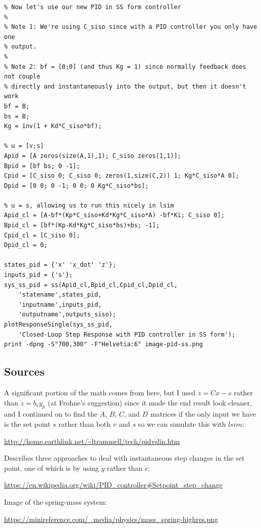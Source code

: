 \documentclass[10pt,letterpaper]{article}
\begin{document}
\begin{verbatim}
% Now let's use our new PID in SS form controller
%
% Note 1: We're using C_siso since with a PID controller you only have one
% output.
%
% Note 2: bf = [0;0] (and thus Kg = 1) since normally feedback does not couple
% directly and instantaneously into the output, but then it doesn't work
bf = B;
bs = B;
Kg = inv(1 + Kd*C_siso*bf);

% u = [v;s]
Apid = [A zeros(size(A,1),1); C_siso zeros(1,1)];
Bpid = [bf bs; 0 -1];
Cpid = [C_siso 0; C_siso 0; zeros(1,size(C,2)) 1; Kg*C_siso*A 0];
Dpid = [0 0; 0 -1; 0 0; 0 Kg*C_siso*bs];

% u = s, allowing us to run this nicely in lsim
Apid_cl = [A-bf*(Kp*C_siso+Kd*Kg*C_siso*A) -bf*Ki; C_siso 0];
Bpid_cl = [bf*(Kp-Kd*Kg*C_siso*bs)+bs; -1];
Cpid_cl = [C_siso 0];
Dpid_cl = 0;

states_pid = {'x' 'x_dot' 'z'};
inputs_pid = {'s'};
sys_ss_pid = ss(Apid_cl,Bpid_cl,Cpid_cl,Dpid_cl,
    'statename',states_pid,
    'inputname',inputs_pid,
    'outputname',outputs_siso);
plotResponseSingle(sys_ss_pid,
    'Closed-Loop Step Response with PID controller in SS form');
print -dpng -S"700,300" -F"Helvetia:6" image-pid-ss.png
\end{verbatim}

\subsection*{Sources}
A significant portion of the math comes from here, but I used $\dot{z} = C x - s$ rather than $\dot{z} = b_e y_p$ (at Frohne's suggestion) since it made the end result look cleaner, and I continued on to find the $A$, $B$, $C$, and $D$ matrices if the only input we have is the set point $s$ rather than both $v$ and $s$ so we can simulate this with $lsim$:

\url{http://home.earthlink.net/~ltrammell/tech/pidvslin.htm}

Describes three approaches to deal with instantaneous step changes in the set point, one of which is by using $\dot{y}$ rather than $\dot{e}$:

\url{https://en.wikipedia.org/wiki/PID_controller#Setpoint_step_change}

Image of the spring-mass system:

\url{https://minireference.com/_media/physics/mass_spring-highres.png}
\end{document}
